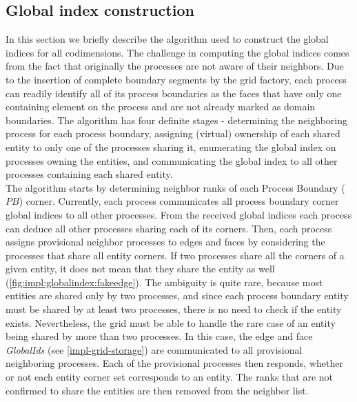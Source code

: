 \subsection{Global index construction}
\label{impl-grid-constructor-globalindex}

\noindent
In this section we briefly describe the algorithm used to construct the global indices for all codimensions. The challenge in computing the global indices comes from the fact that originally the processes are not aware of their neighbors. Due to the insertion of complete boundary segments by the grid factory, each process can readily identify all of its process boundaries as the faces that have only one containing element on the process and are not already marked as domain boundaries. The algorithm has four definite stages - determining the neighboring process for each process boundary, assigning (virtual) ownership of each shared entity to only one of the processes sharing it, enumerating the global index on processes owning the entities, and communicating the global index to all other processes containing each shared entity. \\

\noindent
The algorithm starts by determining neighbor ranks of each Process Boundary ($PB$) corner. Currently, each process communicates all process boundary corner global indices to all other processes. From the received global indices each process can deduce all other processes sharing each of its corners. Then, each process assigns provisional neighbor processes to edges and faces by considering the processes that share all entity corners. If two processes share all the corners of a given entity, it does not mean that they share the entity as well (\cref{fig:impl:globalindex:fakeedge}). The ambiguity is quite rare, because most entities are shared only by two processes, and since each process boundary entity must be shared by at least two processes, there is no need to check if the entity exists. Nevertheless, the grid must be able to handle the rare case of an entity being shared by more than two processes. In this case, the edge and face \textit{GlobalIds} (see \cref{impl-grid-storage}) are communicated to all provisional neighboring processes. Each of the provisional processes then responds, whether or not each entity corner set corresponds to an entity. The ranks that are not confirmed to share the entities are then removed from the neighbor list. \\

